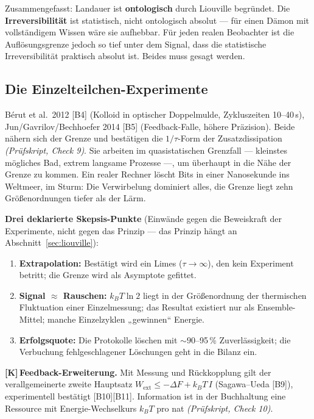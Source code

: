 \documentclass[11pt,a4paper]{article}
\newcommand{\LK}{\textcolor{layK}{\textbf{\footnotesize\textsf{[K]}}}\,}
\newcommand{\pruef}[1]{{\small\itshape(Prüfskript, #1)}}
\begin{document}
Zusammengefasst: Landauer ist \textbf{ontologisch} durch Liouville begründet. Die
\textbf{Irreversibilität} ist statistisch, nicht ontologisch absolut --- für einen
Dämon mit vollständigem Wissen wäre sie aufhebbar. Für jeden realen Beobachter ist
die Auflösungsgrenze jedoch so tief unter dem Signal, dass die statistische
Irreversibilität praktisch absolut ist. Beides muss gesagt werden.

\subsection{Die Einzelteilchen-Experimente}

Bérut et al.\ 2012 [B4] (Kolloid in optischer Doppelmulde, Zykluszeiten
10--40\,s), Jun/Gavrilov/Bechhoefer 2014 [B5] (Feedback-Falle, höhere Präzision).
Beide nähern sich der Grenze und bestätigen die $1/\tau$-Form der
Zusatzdissipation \pruef{Check 9}. Sie arbeiten im quasistatischen Grenzfall ---
kleinstes mögliches Bad, extrem langsame Prozesse ---, um überhaupt in die Nähe
der Grenze zu kommen. Ein realer Rechner löscht Bits in einer Nanosekunde ins
Weltmeer, im Sturm: Die Verwirbelung dominiert alles, die Grenze liegt zehn
Größenordnungen tiefer als der Lärm.

\textbf{Drei deklarierte Skepsis-Punkte} (Einwände gegen die Beweiskraft der
Experimente, nicht gegen das Prinzip --- das Prinzip hängt an
Abschnitt~\ref{sec:liouville}):

\begin{enumerate}[leftmargin=1.6em,itemsep=0.25em]
  \item \textbf{Extrapolation:} Bestätigt wird ein Limes ($\tau\to\infty$), den
        kein Experiment betritt; die Grenze wird als Asymptote gefittet.
  \item \textbf{Signal $\approx$ Rauschen:} $k_B T \ln 2$ liegt in der
        Größenordnung der thermischen Fluktuation einer Einzelmessung; das
        Resultat existiert nur als Ensemble-Mittel; manche Einzelzyklen
        „gewinnen“ Energie.
  \item \textbf{Erfolgsquote:} Die Protokolle löschen mit ${\sim}90$--95\,\%
        Zuverlässigkeit; die Verbuchung fehlgeschlagener Löschungen geht in die
        Bilanz ein.
\end{enumerate}

\LK \textbf{Feedback-Erweiterung.} Mit Messung und Rückkopplung gilt der
verallgemeinerte zweite Hauptsatz $W_{\text{ext}} \le -\Delta F + k_B T\,I$
(Sagawa--Ueda [B9]), experimentell bestätigt [B10][B11]. Information ist in der
Buchhaltung eine Ressource mit Energie-Wechselkurs $k_B T$ pro nat
\pruef{Check 10}.
\end{document}
